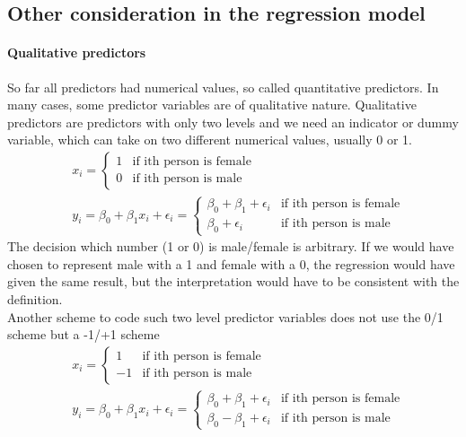 \documentclass[../document.tex]{subfiles}
\begin{document}
	\subsection{Other consideration in the regression model}
	\paragraph{Qualitative predictors}
	So far all predictors had numerical values, so called quantitative predictors. In many cases, some predictor variables are of qualitative nature. Qualitative predictors are predictors with only two levels and we need an indicator or dummy variable, which can take on two different numerical values, usually 0 or 1.
	\begin{equation}
	\begin{split}
		&x_{i}=\begin{cases}
			1 &\text{if ith person is female}\\
			0 &\text{if ith person is male}
		\end{cases}\\
		&y_{i} = \beta_{0}+\beta_{1}x_{i}+\epsilon_{i}=\begin{cases}
			\beta_{0}+\beta_{1}+\epsilon_{i} &\text{if ith person is female}\\
			\beta_{0}+\epsilon_{i} &\text{if ith person is male}
		\end{cases}
	\end{split}
	\end{equation}
	The decision which number (1 or 0) is male/female is arbitrary. If we would have chosen to represent male with a 1 and female with a 0, the regression would have given the same result, but the interpretation would have to be consistent with the definition.\\
	Another scheme to code such two level predictor variables does not use the 0/1 scheme but a -1/+1 scheme
	\begin{equation}
	\begin{split}
	&x_{i}=\begin{cases}
	1 &\text{if ith person is female}\\
	-1 &\text{if ith person is male}
	\end{cases}\\
	&y_{i} = \beta_{0}+\beta_{1}x_{i}+\epsilon_{i}=\begin{cases}
	\beta_{0}+\beta_{1}+\epsilon_{i} &\text{if ith person is female}\\
	\beta_{0}-\beta_{1}+\epsilon_{i} &\text{if ith person is male}
	\end{cases}
	\end{split}
	\end{equation}
\end{document}
